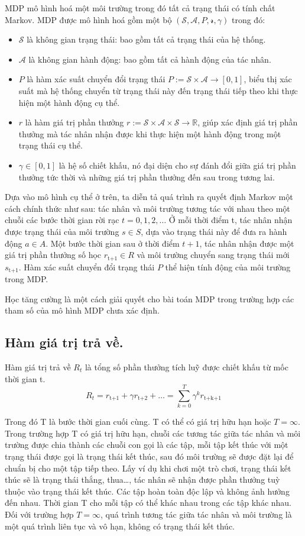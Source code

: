 \documentclass{uetgraduation}
\begin{document}
MDP mô hình hoá một môi trường trong đó tất cả trạng thái có tính chất Markov. MDP được mô hình hoá gồm một bộ $(\mathcal{S}, \mathcal{A}, P, \mathcal{r}, \gamma)$ trong đó:
\begin{itemize}
    \item $\mathcal{S}$ là không gian trạng thái: bao gồm tất cả trạng thái của hệ thống.
    \item $\mathcal{A}$ là không gian hành động: bao gồm tất cả hành động của tác nhân.
    \item $P$ là hàm xác suất chuyển đổi trạng thái $P := \mathcal{S} \times \mathcal{A} \to [0, 1] $, biểu thị xác suất mà hệ thống chuyển từ trạng thái này đến trạng thái tiếp theo khi thực hiện
    một hành động cụ thể.
    \item $r$ là hàm giá trị phần thưởng $r := \mathcal{S} \times \mathcal{A} \times \mathcal{S} \to \mathbb{R}$, giúp xác định giá trị phần thưởng mà tác nhân nhận được khi thực hiện một hành động
    trong một trạng thái cụ thể.
    \item $\gamma \in [0, 1]$ là hệ số chiết khấu, nó đại diện cho sự đánh đổi giữa giá trị phần thưởng tức thời và những giá trị phần thưởng đến sau trong tương lai.
\end{itemize}

Dựa vào mô hình cụ thể ở trên, ta diễn tả quá trình ra quyết định Markov một cách chính thức như sau: tác nhân và môi trường tương tác với nhau theo một chuỗi các bước thời gian rời rạc
$t = 0, 1, 2,\dots$ Ở mỗi thời điểm t, tác nhân nhận được trạng thái của môi trường $s \in S$, dựa vào trạng thái này để đưa ra hành động $a \in A$. Một bước thời gian sau ở thời điểm $t+1$,
tác nhân nhận được một giá trị phần thưởng số học $r_\text{t+1} \in R$ và môi trường chuyển sang trạng thái mới $s_\text{t+1}$. Hàm xác suất chuyển đổi trạng thái $P$ thể hiện tính động của
môi trường trong MDP.

Học tăng cường là một cách giải quyết cho bài toán MDP trong trường hợp các tham số của mô hình MDP chưa xác định.

\subsection{Hàm giá trị trả về.}
Hàm giá trị trả về $R_t$ là tổng số phần thưởng tích luỹ được chiết khấu từ mốc thời gian t.
\[
R_t = r_\text{t+1} + \gamma r_\text{t+2} + \dots = \sum_{k=0}^{T} \gamma^k r_\text{t+k+1}
\]

Trong đó T là bước thời gian cuối cùng. T có thể có giá trị hữu hạn hoặc $T = \infty$. Trong trường hợp T có giá trị hữu hạn, chuỗi các tương tác giữa tác nhân và môi trường được chia thành các chuỗi
con gọi là các tập, mỗi tập kết thúc với một trạng thái được gọi là trạng thái kết thúc, sau đó môi trường sẽ được đặt lại để chuẩn bị cho một tập tiếp theo. Lấy ví dụ khi chơi một trò chơi, trạng thái
kết thúc sẽ là trạng thái thắng, thua\dots, tác nhân sẽ nhận được phần thưởng tuỳ thuộc vào trạng thái kết thúc. Các tập hoàn toàn độc lập và không ảnh hưởng đến nhau. Thời gian T cho mỗi tập có thể khác
nhau trong các tập khác nhau. Đối với trường hợp $T = \infty$, quá trình tương tác giữa tác nhân và môi trường là một quá trình liên tục và vô hạn, không có trạng thái kết thúc.
\end{document}

